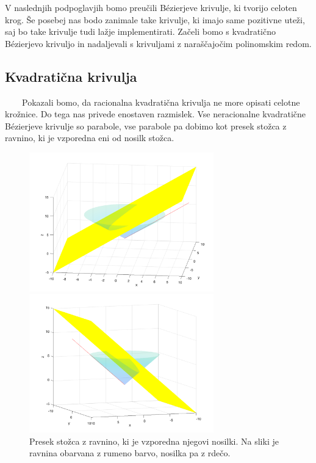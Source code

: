 \documentclass[a4paper,11pt]{article}
\theoremstyle{definition}
\theoremstyle{plain}
\begin{document}
V naslednjih podpoglavjih bomo preučili B\'ezierjeve krivulje, ki tvorijo celoten krog. 
Še posebej nas bodo zanimale take krivulje, ki imajo same pozitivne uteži, saj bo take krivulje tudi lažje implementirati.
Začeli bomo s kvadratično B\'ezierjevo krivuljo in nadaljevali s krivuljami z naraščajočim polinomskim redom.


\subsection{ Kvadratična krivulja}\label{kvadraticna}
\ \ \ \
Pokazali bomo, da racionalna kvadratična krivulja ne more opisati celotne krožnice. Do tega nas privede enostaven razmislek. 
Vse neracionalne kvadratične B\'ezierjeve krivulje so parabole, vse parabole pa dobimo kot presek stožca z ravnino, ki je vzporedna eni od nosilk stožca. 
\begin{figure}[ht!]
    \begin{minipage}{0.5\textwidth}
        \centering
        \includegraphics[width=80mm]{stozec_presek_1.png}
    \end{minipage}\hfill
    \begin{minipage}{0.5\textwidth}
        \centering
        \includegraphics[width=80mm]{stozec_presek_2.png}
    \end{minipage}\hfill
    \caption{Presek stožca z ravnino, ki je vzporedna njegovi nosilki. Na sliki je ravnina obarvana z rumeno barvo, nosilka pa z rdečo.}
\end{figure}
\end{document}
